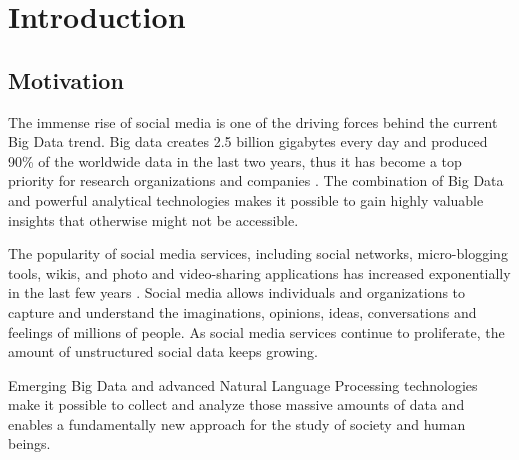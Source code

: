 
\chapter{Introduction}
\label{cha:introduction}

\section{Motivation}
\label{sec:motivation}
The immense rise of social media is one of the driving forces behind the current Big Data trend. Big data creates 2.5 billion gigabytes every day and produced 90\% of the worldwide data in the last two years, thus it has become a top priority for research organizations and companies \cite{ibm2012bigdata}. The combination of Big Data and powerful analytical technologies makes it possible to gain highly valuable insights that otherwise might not be accessible. 

The popularity of social media services, including social networks, micro-blogging tools, wikis, and photo and video-sharing applications has increased exponentially in the last few years \cite{cambria2013big}. Social media allows individuals and organizations to capture and understand the imaginations, opinions, ideas, conversations and feelings of millions of people. As social media services continue to proliferate, the amount of unstructured social data keeps growing. 

Emerging Big Data and advanced Natural Language Processing technologies make it possible to collect and analyze those massive amounts of data and enables a fundamentally new approach for the study of society and human beings. 

